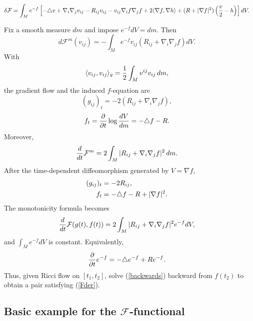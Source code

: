 \begin{equation}\label{putting}
\delta{\mathcal F}=\int_Me^{-f}\left[-\triangle v+\nabla_i\nabla_jv_{ij}-R_{ij}v_{ij}
-v_{ij}\nabla_if\nabla_jf+2\langle\nabla f,\nabla h\rangle
+(R+|\nabla f|^2)\left({v\over2}-h\right)\right]dV.
\end{equation}

Fix a smooth measure $dm$ and impose $e^{-f}dV=dm$. Then
\begin{equation}
d{\mathcal F}^m(v_{ij})=-\int_Me^{-f}v_{ij}(R_{ij}+\nabla_i\nabla_jf)dV.
\end{equation}
With
\begin{equation}
\langle v_{ij},v_{ij}\rangle_g={1\over2}\int_Mv^{ij}v_{ij}\,dm,
\end{equation}
the gradient flow and the induced $f$-equation are
\begin{equation}\label{Fflow}
(g_{ij})_t=-2(R_{ij}+\nabla_i\nabla_jf),
\end{equation}
\begin{equation}
f_t={\partial\over\partial t}\log{dV\over dm}=-\triangle f-R.
\end{equation}
Moreover,
\begin{equation}\label{Fchange}
{d\over dt}{\mathcal F}^m=2\int_M|R_{ij}+\nabla_i\nabla_jf|^2\,dm.
\end{equation}
After the time-dependent diffeomorphism generated by $V=\nabla f$,
\begin{align}\label{newevolution}
(g_{ij})_t&=-2R_{ij},\\
f_t&=-\triangle f-R+|\nabla f|^2.\notag
\end{align}
The monotonicity formula becomes
\begin{equation}\label{Fder}
{d\over dt}{\mathcal F}(g(t),f(t))=2\int_M|R_{ij}+\nabla_i\nabla_jf|^2e^{-f}dV,
\end{equation}
and $\int_Me^{-f}dV$ is constant. Equivalently,
\begin{equation}\label{backwards}
{\partial\over\partial t}e^{-f}=-\triangle e^{-f}+Re^{-f}.
\end{equation}
Thus, given Ricci flow on $[t_1,t_2]$, solve (\ref{backwards}) backward from
$f(t_2)$ to obtain a pair satisfying (\ref{Fder}).

\subsection{Basic example for the ${\mathcal F}$-functional}

